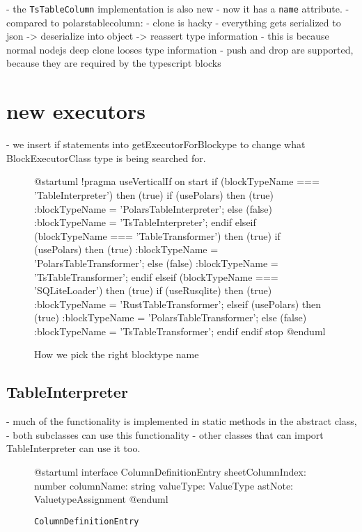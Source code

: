 - the \Verb|TsTableColumn| implementation is also new
- now it has a \Verb|name| attribute.
- compared to polarstablecolumn:
- clone is hacky
- everything gets serialized to json -> deserialize into object -> reassert type information
- this is because normal nodejs deep clone looses type information
- push and drop are supported, because they are required by the typescript blocks


\section{new executors}
- we insert if statements into getExecutorForBlockype to change what BlockExecutorClass type is being searched for.
\begin{figure}
	\begin{plantuml}
		@startuml
		!pragma useVerticalIf on
		start
		if (blockTypeName === 'TableInterpreter') then (true)
		if (usePolars) then (true)
		:blockTypeName = 'PolarsTableInterpreter';
		else (false)
		:blockTypeName = 'TsTableInterpreter';
		endif
		elseif (blockTypeName === 'TableTransformer') then (true)
		if (usePolars) then (true)
		:blockTypeName = 'PolarsTableTransformer';
		else (false)
		:blockTypeName = 'TsTableTransformer';
		endif
		elseif (blockTypeName === 'SQLiteLoader') then (true)
		if (useRusqlite) then (true)
		:blockTypeName = 'RustTableTransformer';
		elseif (usePolars) then (true)
		:blockTypeName = 'PolarsTableTransformer';
		else (false)
		:blockTypeName = 'TsTableTransformer';
		endif
		endif
		stop
		@enduml
	\end{plantuml}
	\caption{How we pick the right blocktype name}\label{fig:uml:getExecutorForBlockType}
\end{figure}


\subsection{TableInterpreter} %
- much of the functionality is implemented in static methods in the abstract class,
- both subclasses can use this functionality
- other classes that can import TableInterpreter can use it too.

\begin{figure}
	\begin{plantuml}
		@startuml
		interface ColumnDefinitionEntry {
				sheetColumnIndex: number
				columnName: string
				valueType: ValueType
				astNote: ValuetypeAssignment
			}
		@enduml
	\end{plantuml}
	\caption{\Verb|ColumnDefinitionEntry|}\label{fig:uml:ColumnDefinitionEntry}
\end{figure}


